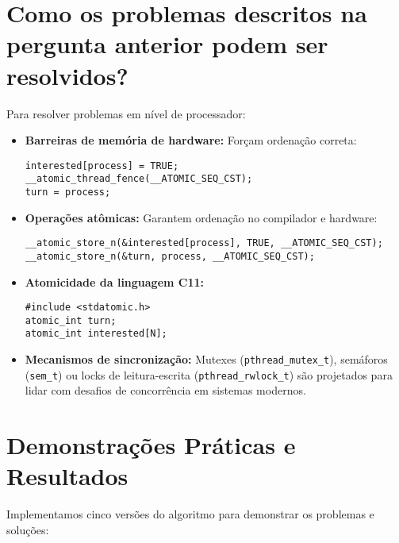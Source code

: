 \documentclass[10pt]{article}
\begin{document}
\section{Como os problemas descritos na pergunta anterior podem ser resolvidos?}

Para resolver problemas em nível de processador:

\begin{itemize}
    \item \textbf{Barreiras de memória de hardware:} Forçam ordenação correta:
    \begin{lstlisting}
interested[process] = TRUE;
__atomic_thread_fence(__ATOMIC_SEQ_CST);
turn = process;
    \end{lstlisting}

    \item \textbf{Operações atômicas:} Garantem ordenação no compilador e hardware:
    \begin{lstlisting}
__atomic_store_n(&interested[process], TRUE, __ATOMIC_SEQ_CST);
__atomic_store_n(&turn, process, __ATOMIC_SEQ_CST);
    \end{lstlisting}

    \item \textbf{Atomicidade da linguagem C11:}
    \begin{lstlisting}
#include <stdatomic.h>
atomic_int turn;
atomic_int interested[N];
    \end{lstlisting}

    \item \textbf{Mecanismos de sincronização:} Mutexes (\texttt{pthread\_mutex\_t}), semáforos (\texttt{sem\_t}) ou locks de leitura-escrita (\texttt{pthread\_rwlock\_t}) são projetados para lidar com desafios de concorrência em sistemas modernos.
\end{itemize}

\section{Demonstrações Práticas e Resultados}

Implementamos cinco versões do algoritmo para demonstrar os problemas e soluções:
\end{document}
